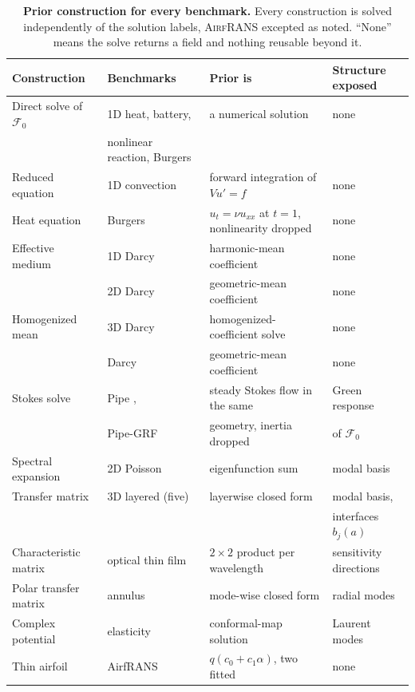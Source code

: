 \documentclass{article}
\begin{document}
\begin{table}[H]
\centering
\setlength{\tabcolsep}{5pt}
\renewcommand{\arraystretch}{0.7}
\caption{\textbf{Prior construction for every benchmark.} Every construction is solved
independently of the solution labels, \textsc{AirfRANS} excepted as noted. ``None'' means the solve
returns a field and nothing reusable beyond it.}
\label{tab:constructions}
\vspace{1mm}
\footnotesize
\begin{tabular}{@{}llll@{}}
\toprule
Construction & Benchmarks & Prior is & Structure exposed \\
\midrule
Direct solve of $\mathcal{F}_0$ & 1D heat, battery,            & a numerical solution & none \\
                                & nonlinear reaction, Burgers  &                      &     \\
Reduced equation      & 1D convection            & forward integration of $Vu'=f$ & none \\
Heat equation         & Burgers \citep{li2020fourier} & $u_t=\nu u_{xx}$ at $t=1$, nonlinearity dropped & none \\
Effective medium      & 1D Darcy                 & harmonic-mean coefficient      & none \\
                      & 2D Darcy                 & geometric-mean coefficient     & none \\
Homogenized mean      & 3D Darcy                 & homogenized-coefficient solve  & none \\
                      & Darcy \citep{li2020fourier} & geometric-mean coefficient  & none \\
Stokes solve          & Pipe \citep{li2023fourier}, & steady Stokes flow in the same & Green response \\
                      & Pipe-GRF                 & geometry, inertia dropped      & of $\mathcal{F}_0$ \\
Spectral expansion    & 2D Poisson               & eigenfunction sum              & modal basis \\
Transfer matrix       & 3D layered (five)        & layerwise closed form          & modal basis, \\
                      &                          &                                & interfaces $b_j(a)$ \\
Characteristic matrix & optical thin film        & $2\times2$ product per wavelength & sensitivity directions \\
Polar transfer matrix & annulus                  & mode-wise closed form          & radial modes \\
Complex potential     & elasticity               & conformal-map solution         & Laurent modes \\
Thin airfoil          & AirfRANS                 & $q(c_0+c_1\alpha)$, two fitted & none \\
\bottomrule
\end{tabular}
  \vspace{-3mm}
\end{table}
\end{document}
